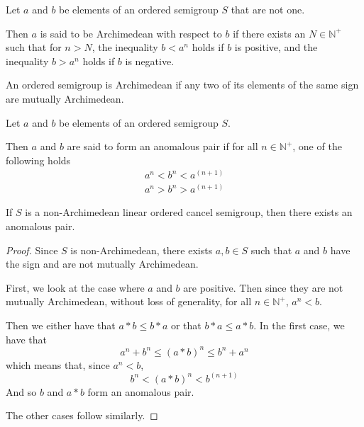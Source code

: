 \begin{definition}\label{def:arch_wrt}\leanok
{}
Let $a$ and $b$ be elements of an ordered semigroup $S$ that are not one.

Then $a$ is said to be Archimedean with respect to $b$
if there exists an $N\in \mathbb{N}^+$ such that for $n > N$,
the inequality $b < a^n$ holds if $b$ is positive,
and the inequality $b > a^n$ holds if $b$ is negative.
\end{definition}

\begin{definition}\label{def:arch}\leanok
{}
An ordered semigroup is Archimedean if any two of its elements
of the same sign are mutually Archimedean.
\end{definition}

\begin{definition}\label{def:anomalous_pair}\leanok
Let $a$ and $b$ be elements of an ordered semigroup $S$.

Then $a$ and $b$ are said to form an anomalous pair
if for all $n\in \mathbb{N}^+$, one of the following holds
\begin{align}
a^n < b^n < a^(n+1) \\
a^n > b^n > a^(n+1)
\end{align}
\end{definition}

\begin{theorem}\label{non_arch_anomalous}\leanok
{}
If $S$ is a non-Archimedean linear ordered cancel semigroup, then there exists an anomalous pair.
\end{theorem}
\begin{proof}
Since $S$ is non-Archimedean, there exists $a,b\in S$ such that
$a$ and $b$ have the sign and are not mutually Archimedean.

First, we look at the case where $a$ and $b$ are positive.
Then since they are not mutually Archimedean, without loss of generality, for all $n\in \mathbb{N}^+$,
$a^n < b$.

Then we either have that $a * b \le b * a$ or that $b*a\le a * b$.
In the first case, we have that
\[
a^n + b^n \le (a*b)^n \le b^n + a^n
\]
which means that, since $a^n < b$,
\[
b^n < (a*b)^n < b^(n+1)
\]
And so $b$ and $a*b$ form an anomalous pair.

The other cases follow similarly.
\end{proof}

